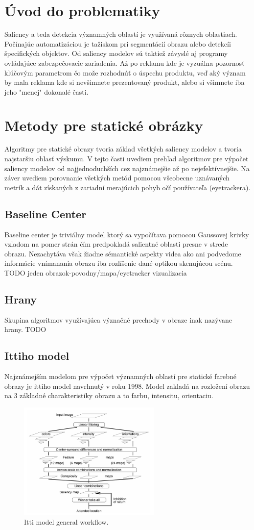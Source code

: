 \section{Úvod do problematiky}
Saliency a teda detekcia významných oblastí je využívaná rôznych oblastiach. Počínajúc automatizáciou je tažiskom pri segmentácií obrazu alebo detekcíi špecifických objektov. Od saliency modelov sú taktiež závyslé aj programy ovládajúce zabezpečovacie zariadenia. Až po reklamu kde je vyzuálna pozornosť klúčovým parametrom čo može rozhodnúť o úspechu produktu, veď aký význam by mala reklama kde si nevšimnete prezentovaný produkt, alebo si všimnete iba jeho "menej" dokonalé časti.
\section{Metody pre statické obrázky}
Algoritmy pre statické obrazy tvoria základ všetkých saliency modelov a tvoria najstaršiu oblasť výskumu. V tejto časti uvediem prehľad algoritmov pre výpočet saliency modelov od najjednoduchších cez najznámejšie až po nejefektívnejšie. Na záver uvediem porovnanie všetkých metód pomocou všeobecne uznávaných metrík a dát získaných z zariadní merajúcich pohyb očí používateľa (eyetrackera).
\subsection{Baseline Center}\label{section:caseline-center}
Baseline center je triviálny model ktorý sa vypočítava pomocou Gaussovej krivky vzľadom na pomer strán čím predpokladá salientné oblasti presne v strede obrazu. Nezachytáva však žiadne sémantické aspekty videa ako ani podvedome informácie vnímanania obrazu iba rozlíšenie dané optikou skenujúcou scénu.
TODO jeden obrazok-povodny/mapa/eyetracker vizualizacia
\subsection{Hrany}
Skupina algoritmov využívajúca význačné prechody v obraze inak nazývane hrany.
TODO
\subsection{Ittiho model}
Najznámejším modelom pre výpočet významných oblastí pre statické farebné obrazy je ittiho model navrhnutý v roku 1998. Model zakladá na rozložení obrazu na 3 základné charakteristiky obrazu a to farbu, intensitu, orientaciu.

\begin{figure}
\includegraphics[width=7cm]{pics/itti-1.png}
\caption{Itti model general workflow.}\label{wrap-fig:1}
\end{figure}

